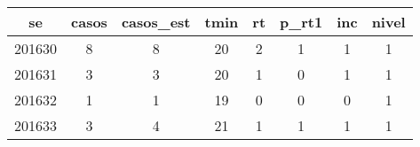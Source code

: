 \begin{tabular}{c|ccccccc}
  \hline
se & casos & casos\_est & tmin & rt & p\_rt1 & inc & nivel \\ 
  \hline
201630 & 8 & 8 & 20 & 2 & 1 & 1 & 1 \\ 
  201631 & 3 & 3 & 20 & 1 & 0 & 1 & 1 \\ 
  201632 & 1 & 1 & 19 & 0 & 0 & 0 & 1 \\ 
  201633 & 3 & 4 & 21 & 1 & 1 & 1 & 1 \\ 
   \hline
\end{tabular}

